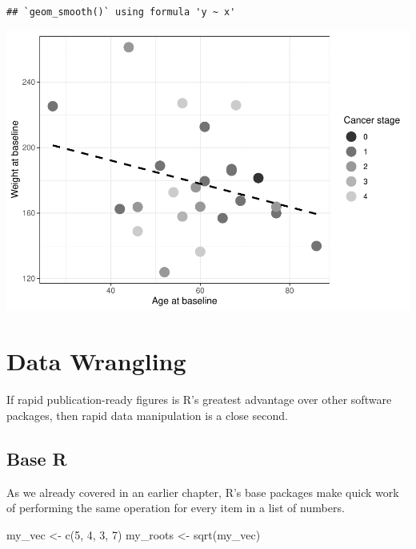 \documentclass[
]{book}
\newenvironment{Shaded}{\begin{snugshade}}{\end{snugshade}}
\newcommand{\DecValTok}[1]{\textcolor[rgb]{0.00,0.00,0.81}{#1}}
\newcommand{\FunctionTok}[1]{\textcolor[rgb]{0.00,0.00,0.00}{#1}}
\newcommand{\NormalTok}[1]{#1}
\newcommand{\OtherTok}[1]{\textcolor[rgb]{0.56,0.35,0.01}{#1}}
\begin{document}
\begin{verbatim}
## `geom_smooth()` using formula 'y ~ x'
\end{verbatim}

\includegraphics{_main_files/figure-latex/unnamed-chunk-96-1.pdf}

\hypertarget{data-wrangling}{%
\chapter{Data Wrangling}\label{data-wrangling}}

If rapid publication-ready figures is R's greatest advantage over other software packages, then rapid data manipulation is a close second.

\hypertarget{base-r}{%
\section{Base R}\label{base-r}}

As we already covered in an earlier chapter, R's base packages make quick work of performing the same operation for every item in a list of numbers.

\begin{Shaded}
\begin{Highlighting}[]
\NormalTok{my\_vec }\OtherTok{\textless{}{-}} \FunctionTok{c}\NormalTok{(}\DecValTok{5}\NormalTok{, }\DecValTok{4}\NormalTok{, }\DecValTok{3}\NormalTok{, }\DecValTok{7}\NormalTok{)}
\NormalTok{my\_roots }\OtherTok{\textless{}{-}} \FunctionTok{sqrt}\NormalTok{(my\_vec)}
\end{Highlighting}
\end{Shaded}
\end{document}

